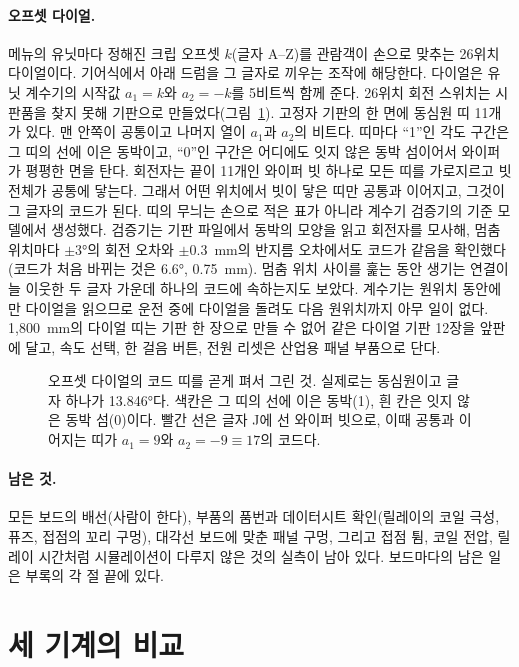 \paragraph{오프셋 다이얼.} 메뉴의 유닛마다 정해진 크립 오프셋 $k$(글자 A--Z)를 관람객이 손으로 맞추는 26위치 다이얼이다.
기어식에서 아래 드럼을 그 글자로 끼우는 조작에 해당한다. 다이얼은 유닛 계수기의 시작값 $a_1 = k$와 $a_2 = -k$를 5비트씩
함께 준다. 26위치 회전 스위치는 시판품을 찾지 못해 기판으로 만들었다(그림~\ref{fig:hw-offset-dial}). 고정자 기판의 한 면에
동심원 띠 11개가 있다. 맨 안쪽이 공통이고 나머지 열이 $a_1$과 $a_2$의 비트다. 띠마다 ``1''인 각도 구간은 그 띠의 선에
이은 동박이고, ``0''인 구간은 어디에도 잇지 않은 동박 섬이어서 와이퍼가 평평한 면을 탄다. 회전자는 끝이 11개인 와이퍼 빗
하나로 모든 띠를 가로지르고 빗 전체가 공통에 닿는다. 그래서 어떤 위치에서 빗이 닿은 띠만 공통과 이어지고, 그것이 그 글자의
코드가 된다. 띠의 무늬는 손으로 적은 표가 아니라 계수기 검증기의 기준 모델에서 생성했다. 검증기는 기판 파일에서 동박의
모양을 읽고 회전자를 모사해, 멈춤 위치마다 $\pm 3$°의 회전 오차와 $\pm 0.3$~mm의 반지름 오차에서도 코드가 같음을
확인했다(코드가 처음 바뀌는 것은 6.6°, 0.75~mm). 멈춤 위치 사이를 훑는 동안 생기는 연결이 늘 이웃한 두 글자 가운데 하나의
코드에 속하는지도 보았다. 계수기는 원위치 동안에만 다이얼을 읽으므로 운전 중에 다이얼을 돌려도 다음 원위치까지 아무 일이
없다. 1,800~mm의 다이얼 띠는 기판 한 장으로 만들 수 없어 같은 다이얼 기판 12장을 앞판에 달고, 속도 선택, 한 걸음 버튼,
전원 리셋은 산업용 패널 부품으로 단다.

\begin{figure}[ht]
\centering

\caption{오프셋 다이얼의 코드 띠를 곧게 펴서 그린 것. 실제로는 동심원이고 글자 하나가 13.846°다. 색칸은 그 띠의 선에
이은 동박(1), 흰 칸은 잇지 않은 동박 섬(0)이다. 빨간 선은 글자 J에 선 와이퍼 빗으로, 이때 공통과 이어지는 띠가
$a_1 = 9$와 $a_2 = -9 \equiv 17$의 코드다.}
\label{fig:hw-offset-dial}
\end{figure}

\paragraph{남은 것.} 모든 보드의 배선(사람이 한다), 부품의 품번과 데이터시트 확인(릴레이의 코일 극성, 퓨즈, 접점의 꼬리 구멍),
대각선 보드에 맞춘 패널 구멍, 그리고 접점 튐, 코일 전압, 릴레이 시간처럼 시뮬레이션이 다루지 않은 것의 실측이 남아 있다.
보드마다의 남은 일은 부록의 각 절 끝에 있다.

\section{세 기계의 비교}\label{sec:hw-three}

